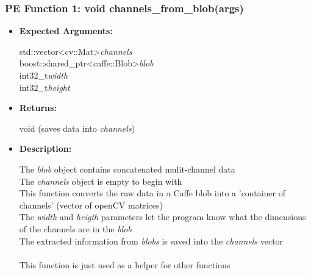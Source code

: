 \documentclass{scrreprt}
\begin{document}
\subsubsection{PE Function 1: void channels\_from\_blob(args)}
\begin{itemize}
    \item \textbf{Expected Arguments:}

    std::vector\textless cv::Mat\textgreater\quad\textit{channels}
    \\
    boost::shared\_ptr\textless caffe::Blob\textgreater\quad\textit{blob}
    \\
    int32\_t\quad\textit{width}
    \\
    int32\_t\quad\textit{height}

    \item \textbf{Returns:}

    void (saves data into \textit{channels})

    \item \textbf{Description:}

    The \textit{blob} object contains concatenated mulit-channel data
    \\
    The \textit{channels} object is empty to begin with
    \\
    This function converts the raw data in a Caffe blob into a 'container of channels' (vector of openCV matrices)
    \\
    The \textit{width} and \textit{heigth} parameters let the program know what the dimensions of the channels are in the \textit{blob}
    \\
    The extracted information from \textit{blobs} is saved into the \textit{channels} vector
    \\\\
    This function is just used as a helper for other functions
\end{itemize}
\end{document}
